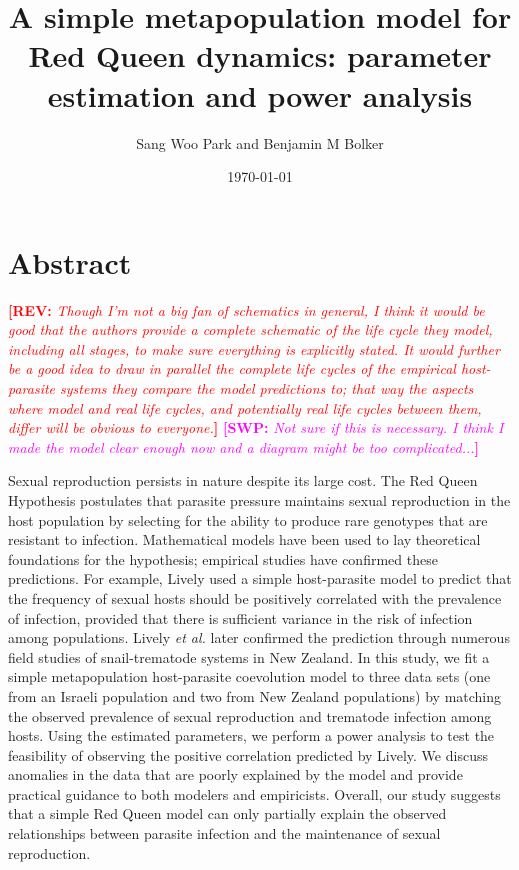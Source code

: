 \documentclass{article}\usepackage[]{graphicx}\usepackage[]{color}
\title{A simple metapopulation model for Red Queen dynamics: parameter estimation and power analysis}
\author{Sang Woo Park and Benjamin M Bolker}
\date{\today}
\newcommand{\comment}[3]{\textcolor{#1}{\textbf{[#2: }\textit{#3}\textbf{]}}}
\newcommand{\swp}[1]{\comment{magenta}{SWP}{#1}}
\newcommand{\rev}[1]{\comment{red}{REV}{#1}}
\begin{document}
\maketitle

\section*{Abstract}

\rev{Though I’m not a big fan of schematics in general, I think it would be good that the authors provide a complete schematic of the life cycle they model, including all stages, to make sure everything is explicitly stated. It would further be a good idea to draw in parallel the complete life cycles of the empirical host-parasite systems they compare the model predictions to; that way the aspects where model and real life cycles, and potentially real life cycles between them, differ will be obvious to everyone.}
\swp{Not sure if this is necessary. I think I made the model clear enough now and a diagram might be too complicated...}

Sexual reproduction persists in nature despite its large cost.
The Red Queen Hypothesis postulates that parasite pressure maintains sexual reproduction in the host population by selecting for the ability to produce rare genotypes that are resistant to infection.
Mathematical models have been used to lay theoretical foundations for the hypothesis; empirical studies have confirmed these predictions.
For example, Lively used a simple host-parasite model to predict that the frequency of sexual hosts should be positively correlated with the prevalence of infection, provided that there is sufficient variance in the risk of infection among populations. 
Lively \textit{et al.} later confirmed the prediction through numerous field studies of snail-trematode systems in New Zealand.
In this study, we fit a simple metapopulation host-parasite coevolution model to three data sets (one from an Israeli population and two from New Zealand populations) by matching the observed prevalence of sexual reproduction and trematode infection among hosts.
Using the estimated parameters, we perform a power analysis to test the feasibility of observing the positive correlation predicted by Lively.
We discuss anomalies in the data that are poorly explained by the model and provide practical guidance to both modelers and empiricists.
Overall, our study suggests that a simple Red Queen model can only partially explain the observed relationships between parasite infection and the maintenance of sexual reproduction.
\end{document}
